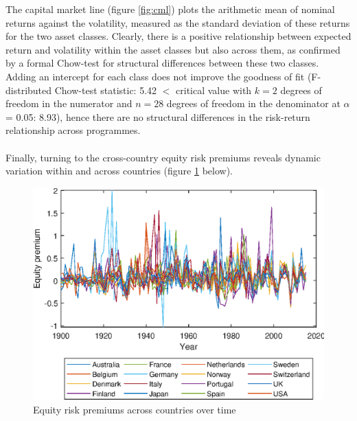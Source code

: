 {{The capital market line (figure \ref{fig:cml}) plots the arithmetic mean of nominal returns against the volatility, measured as the standard deviation of these returns for the two asset classes. Clearly, there is a positive relationship between expected return and volatility within the asset classes but also across them, as confirmed by a formal Chow-test for structural differences between these two classes. Adding an intercept for each class does not improve the goodness of fit (F-distributed Chow-test statistic: 5.42 $<$ critical value with $k=2$ degrees of freedom in the numerator and $n=28$ degrees of freedom in the denominator at $\alpha$ = 0.05: 8.93), hence there are no structural differences in the risk-return relationship across programmes.\\
\\
Finally, turning to the cross-country equity risk premiums reveals dynamic variation within and across countries (figure \ref{fig:erp_countries_time} below).

\begin{figure}[H]
	\centering
  \includegraphics[width=\textwidth]{Matlab Graphics/Figure_5_ERP_countries}
	\caption{Equity risk premiums across countries over time}
	\label{fig:erp_countries_time}
\end{figure}

}}
